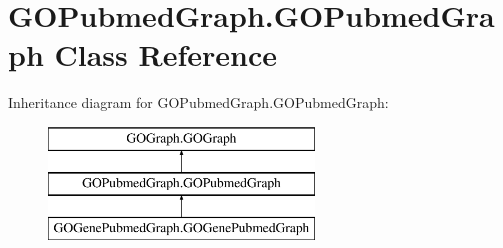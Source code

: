 \hypertarget{class_g_o_pubmed_graph_1_1_g_o_pubmed_graph}{
\section{GOPubmedGraph.GOPubmedGraph Class Reference}
\label{class_g_o_pubmed_graph_1_1_g_o_pubmed_graph}
}
Inheritance diagram for GOPubmedGraph.GOPubmedGraph:\begin{figure}[H]
\begin{center}
\leavevmode
\includegraphics[height=3.000000cm]{class_g_o_pubmed_graph_1_1_g_o_pubmed_graph}
\end{center}
\end{figure}

